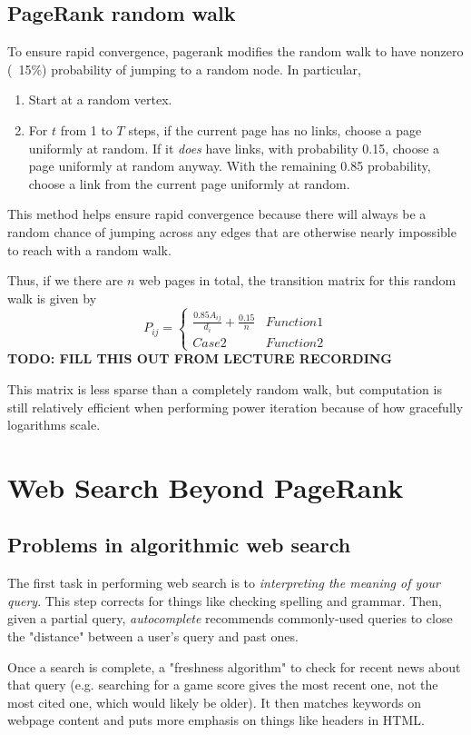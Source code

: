 \documentclass[titlepage, 12pt, leqno]{article}
\begin{document}
\subsection{PageRank random walk}
To ensure rapid convergence, pagerank modifies the random walk to have nonzero
(~15\%) probability of jumping to a random node. In particular,
\begin{enumerate}
    \item Start at a random vertex.
    \item For $t$ from 1 to $T$ steps, if the current page has no links, choose
        a page uniformly at random. If it \textit{does} have links, with 
        probability 0.15, choose a page uniformly at random anyway. With the
        remaining 0.85 probability, choose a link from the current page
        uniformly at random.
\end{enumerate}
This method helps ensure rapid convergence because there will always be a random
chance of jumping across any edges that are otherwise nearly impossible to reach
with a random walk.

Thus, if we there are $n$ web pages in total, the transition matrix for this
random walk is given by
\[
P_{ij} =
\begin{cases}
    \frac{0.85A_{ij}}{d_{i}}+\frac{0.15}{n} & Function 1 \\
    Case 2 & Function 2
\end{cases}
\]
\textbf{TODO: FILL THIS OUT FROM LECTURE RECORDING}

This matrix is less sparse than a completely random walk, but computation is still
relatively efficient when performing power iteration because of how gracefully
logarithms scale.

\pagebreak
\section{Web Search Beyond PageRank}

\subsection{Problems in algorithmic web search}
The first task in performing web search is to \textit{interpreting the meaning of
your query}. This step corrects for things like checking spelling and grammar.
Then, given a partial query, \textit{autocomplete} recommends commonly-used 
queries to close the "distance" between a user's query and past ones. 

Once a search is complete, a "freshness algorithm" to check for recent news 
about that query (e.g. searching for a game score gives the most recent one, not
the most cited one, which would likely be older). It then matches keywords on
webpage content and puts more emphasis on things like headers in HTML.
\end{document}
